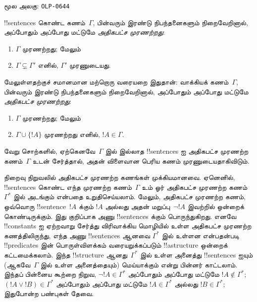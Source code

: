 \documentclass[11pt,a4paper,openany]{memoir}
\begin{document}

\clearpage
\noindent மூல அலகு: \texttt{OLP-0644}\par




\begin{defn}
!!{sentence}s கொண்ட கணம்~$\Gamma$, பின்வரும் இரண்டு நிபந்தனைகளும்
நிறைவேறினால், அப்போதும் அப்போது மட்டுமே \emph{அதிகபட்ச முரணற்றது}:
\begin{enumerate}
\item $\Gamma$ முரணற்றது; மேலும்
\item $\Gamma \subsetneq \Gamma'$ எனில், $\Gamma'$ முரணுடையது.
\end{enumerate}
\end{defn}

\begin{explain}
மேலுள்ளதற்குச் சமானமான மற்றொரு வரையறை இதுதான்: வாக்கியக்
கணம்~$\Gamma$, பின்வரும் இரண்டு நிபந்தனைகளும் நிறைவேறினால்,
அப்போதும் அப்போது மட்டுமே \emph{அதிகபட்ச முரணற்றது}:
\begin{enumerate}
\item $\Gamma$ முரணற்றது; மேலும்
\item $\Gamma \cup \{ !A \}$ முரணற்றது எனில், $!A \in \Gamma$.
\end{enumerate}
வேறு சொற்களில், ஏற்கெனவே~$\Gamma$ இல் இல்லாத !!{sentence}s ஐ
அதிகபட்ச முரணற்ற கணம்~$\Gamma$ உடன் சேர்த்தால், அதன் விளைவான பெரிய கணம்
முரணுடையதாகிவிடும்.
\end{explain}

\begin{explain}
நிறைவு நிறுவலில் அதிகபட்ச முரணற்ற கணங்கள் முக்கியமானவை. ஏனெனில்,
!!{sentence}s கொண்ட எந்த முரணற்ற கணம்~$\Gamma$ உம் ஓர் அதிகபட்ச
முரணற்ற கணம்~$\Gamma^*$ இல் அடங்கும் என்பதை உறுதிசெய்யலாம். மேலும்,
அதிகபட்ச முரணற்ற கணம், ஒவ்வொரு !!{sentence}~$!A$ க்கும் $!A$
அல்லது அதன் மறுப்பு~$\lnot !A$ இவற்றில் ஒன்றைக் கொண்டிருக்கும்.
இது குறிப்பாக அணு !!{sentence}s க்கும் பொருந்துகிறது. எனவே
!!{constant}s ஐ ஏற்றவாறு சேர்த்து விரிவாக்கிய மொழியில் உள்ள
அதிகபட்ச முரணற்ற கணத்திலிருந்து, எந்த அணு !!{sentence}s ஆனவை
$\Gamma^*$ இல் உள்ளன என்பதன்படி !!{predicate}s இன் பொருள்விளக்கம்
வரையறுக்கப்படும் !!a{structure} ஒன்றைக் கட்டமைக்கலாம். இந்த
!!{structure} ஆனது~$\Gamma^*$ இல் உள்ள அனைத்து !!{sentence}s ஐயும்
(ஆகவே~$\Gamma$ இல் உள்ள அனைத்தையும்) மெய்யாக்கும் என்று பின்னர்
காட்டலாம். இந்தப் பின்னைய கூற்றை நிறுவ, $\lnot !A \in
\Gamma^*$ அப்போதும் அப்போது மட்டுமே $!A \notin \Gamma^*$;
$(!A \lor !B) \in \Gamma^*$ அப்போதும் அப்போது மட்டுமே $!A
\in \Gamma^*$ அல்லது $!B \in \Gamma^*$; இதுபோன்ற பண்புகள் தேவை.
\end{explain}
\end{document}
